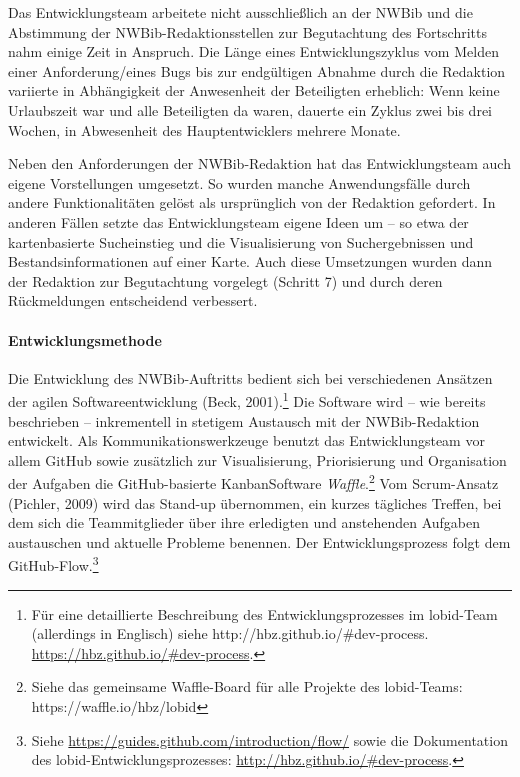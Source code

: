 \documentclass[a4paper,
fontsize=11pt,
oneside,
numbers=noperiodatend,
parskip=half-,
bibliography=totoc,
final
]{scrartcl}
\begin{document}
Das Entwicklungsteam arbeitete nicht ausschließlich an der NWBib und die
Abstimmung der NWBib-Redaktionsstellen zur Begutachtung des Fortschritts
nahm einige Zeit in Anspruch. Die Länge eines Entwicklungszyklus vom
Melden einer Anforderung/eines Bugs bis zur endgültigen Abnahme durch
die Redaktion variierte in Abhängigkeit der Anwesenheit der Beteiligten
erheblich: Wenn keine Urlaubszeit war und alle Beteiligten da waren,
dauerte ein Zyklus zwei bis drei Wochen, in Abwesenheit des
Hauptentwicklers mehrere Monate.

Neben den Anforderungen der NWBib-Redaktion hat das Entwicklungsteam
auch eigene Vorstellungen umgesetzt. So wurden manche Anwendungsfälle
durch andere Funktionalitäten gelöst als ursprünglich von der Redaktion
gefordert. In anderen Fällen setzte das Entwicklungsteam eigene Ideen um
-- so etwa der kartenbasierte Sucheinstieg und die Visualisierung von
Suchergebnissen und Bestandsinformationen auf einer Karte. Auch diese
Umsetzungen wurden dann der Redaktion zur Begutachtung vorgelegt
(Schritt 7) und durch deren Rückmeldungen entscheidend verbessert.

\paragraph{Entwicklungsmethode}\label{entwicklungsmethode}

Die Entwicklung des NWBib-Auftritts bedient sich bei verschiedenen
Ansätzen der agilen Softwareentwicklung (Beck, 2001).\footnote{Für eine
  detaillierte Beschreibung des Entwicklungsprozesses im lobid-Team
  (allerdings in Englisch) siehe http://hbz.github.io/\#dev-process.
  \url{https://hbz.github.io/\#dev-process}.} Die Software wird -- wie
bereits beschrieben -- inkrementell in stetigem Austausch mit der
NWBib-Redaktion entwickelt. Als Kommunikationswerkzeuge benutzt das
Entwicklungsteam vor allem GitHub sowie zusätzlich zur Visualisierung,
Priorisierung und Organisation der Aufgaben die GitHub-basierte
Kanban\-Soft\-ware \emph{Waffle}.\footnote{Siehe das gemeinsame
  Waffle-Board für alle Projekte des lobid-Teams:
  https://waffle.io/hbz/lobid} Vom Scrum-Ansatz (Pichler, 2009) wird das
Stand-up übernommen, ein kurzes tägliches Treffen, bei dem sich die
Teammitglieder über ihre erledigten und anstehenden Aufgaben austauschen
und aktuelle Probleme benennen. Der Entwicklungsprozess folgt dem
GitHub-Flow.\footnote{Siehe
  \url{https://guides.github.com/introduction/flow/} sowie die
  Dokumentation des lobid-Entwicklungsprozesses:
  \url{http://hbz.github.io/\#dev-process}.}
\end{document}
